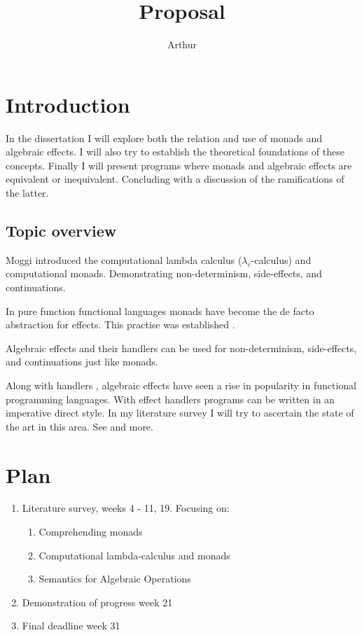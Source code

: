 \documentclass[a4paper,10pt]{article}
\title{Proposal}
\author{Arthur}
\begin{document}
\section{Introduction}

In the dissertation I will explore both the relation and use of monads and algebraic effects.
I will also try to establish the theoretical foundations of these concepts.
Finally I will present programs where monads and algebraic effects are equivalent or
inequivalent. Concluding with a discussion of the ramifications of the latter.

\subsection{Topic overview}
Moggi \cite{Moggi:hc} introduced the computational lambda calculus (${\lambda}_c$-calculus)
and computational monads. Demonstrating non-determinism, side-effects, and continuations.

\par
In pure function functional languages monads have become the de facto abstraction for effects.
This practise was established \cite{wadler1990}.

\par
Algebraic effects \cite{plotkin2001adequacy} and their handlers \cite{Plotkin:2001jr}
can be used for non-determinism, side-effects, and continuations just like monads.

\par
Along with handlers \cite{Plotkin:2009dr},
algebraic effects have seen a rise in popularity in functional programming languages.
With effect handlers programs can be written in an imperative direct style.
In my literature survey I will try to ascertain the state of the art in this area.
See \cite{Lindley:2016vz, Dolan:2017, leijen:16, Bauer:2013fn} and more.



\section{Plan}

\begin{enumerate}
  \item Literature survey, weeks 4 - 11, 19. Focusing on:
    \begin{enumerate}
      \item Comprehending monads                     \cite{wadler1990}
      \item Computational lambda-calculus and monads \cite{Moggi:hc}
      \item Semantics for Algebraic Operations       \cite{Plotkin:2001jr}
    \end{enumerate}
  \item Demonstration of progress week 21
  \item Final deadline week 31
\end{enumerate}
\end{document}
